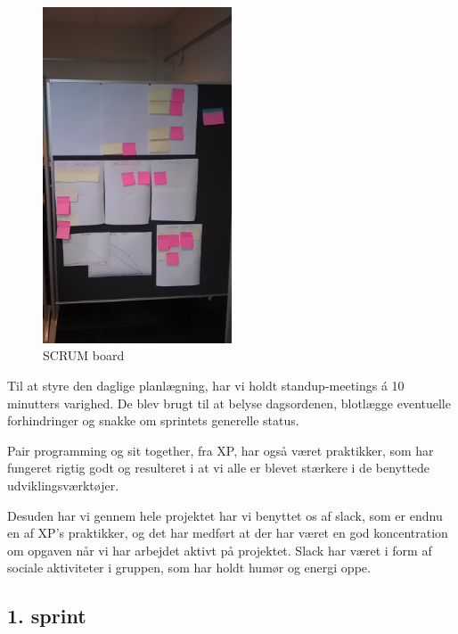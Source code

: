 \documentclass[12pt, a4paper]{report}
\begin{document}
\begin{figure}[ht]
\centering
\includegraphics[width=0.5\textwidth]{scrumboard}
\caption{SCRUM board}
\label{s_board}
\end{figure}

Til at styre den daglige planlægning, har vi holdt standup-meetings á 10 minutters varighed. De blev brugt til at belyse dagsordenen, blotlægge eventuelle forhindringer og snakke om sprintets generelle status.

Pair programming og sit together, fra XP, har også været praktikker, som har fungeret rigtig godt og resulteret i at vi alle er blevet stærkere i de benyttede udviklingsværktøjer.

Desuden har vi gennem hele projektet har vi benyttet os af slack, som er endnu en af XP’s praktikker, og det har medført at der har været en god koncentration om opgaven når vi har arbejdet aktivt på projektet. Slack har været i form af sociale aktiviteter i gruppen, som har holdt humør og energi oppe.

\subsection{1. sprint}
\end{document}
